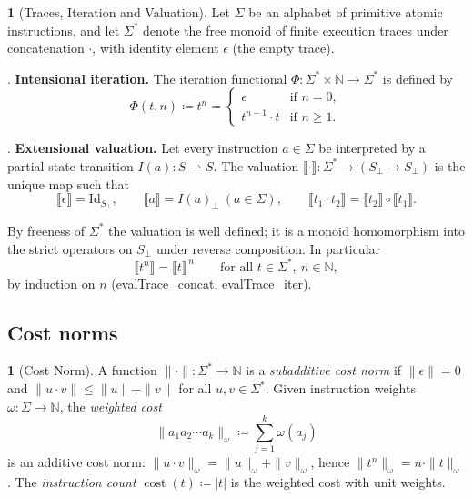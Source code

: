 \documentclass[oneside,english]{amsart}
\numberwithin{equation}{section}
\numberwithin{figure}{section}
\theoremstyle{plain}
\theoremstyle{definition}
\newtheorem{defn}[thm]{\protect\definitionname}
\theoremstyle{plain}
\theoremstyle{remark}
\theoremstyle{plain}
\theoremstyle{definition}
\theoremstyle{plain}
\theoremstyle{remark}
\DeclareMathOperator{\cost}{cost}
\newcommand{\sem}[1]{\llbracket #1 \rrbracket}
\newcommand{\lean}[1]{{\ttfamily\small #1}}
\providecommand{\definitionname}{Definition}
\begin{document}
\begin{defn}[Traces, Iteration and Valuation]
\label{def:trace-functional}
Let $\Sigma$ be an alphabet of primitive atomic instructions, and let $\Sigma^*$ denote the free monoid of finite execution traces under concatenation $\cdot$, with identity element $\epsilon$ (the empty trace).

\smallskip{}. \textbf{Intensional iteration.} The iteration functional $\Phi : \Sigma^* \times \mathbb{N} \to \Sigma^*$ is defined by
\[
\Phi(t, n) \coloneqq t^n = \begin{cases}
\epsilon & \text{if } n = 0, \\
t^{n-1} \cdot t & \text{if } n \ge 1.
\end{cases}
\]

\smallskip{}. \textbf{Extensional valuation.} Let every instruction $a \in \Sigma$ be interpreted by a partial state transition $I(a) : S \rightharpoonup S$. The valuation $\sem{\cdot} : \Sigma^* \to (S_\bot \to S_\bot)$ is the unique map such that
\[
\sem{\epsilon} = \text{Id}_{S_\bot}, \qquad \sem{a} = I(a)_\bot \ (a \in \Sigma), \qquad \sem{t_1 \cdot t_2} = \sem{t_2} \circ \sem{t_1}.
\]
\end{defn}

By freeness of $\Sigma^*$ the valuation is well defined; it is a monoid homomorphism into the strict operators on $S_\bot$ under reverse composition. In particular
\begin{equation}
\label{eq:iter-hom}
\sem{t^n} = \sem{t}^{\,n} \qquad \text{for all } t \in \Sigma^*,\ n \in \mathbb{N},
\end{equation}
by induction on $n$ (\lean{evalTrace\_\allowbreak concat}, \lean{evalTrace\_\allowbreak iter}).

\subsection{Cost norms}

\begin{defn}[Cost Norm]\label{def:subadditive-norm}
A function $\|\cdot\| : \Sigma^* \to \mathbb{N}$ is a \textit{subadditive cost norm} if $\|\epsilon\| = 0$ and
$\|u \cdot v\| \le \|u\| + \|v\|$ for all $u, v \in \Sigma^*$. Given instruction weights $\omega : \Sigma \to \mathbb{N}$, the
\textit{weighted cost}
\[
\|a_1 a_2 \cdots a_k\|_\omega \coloneqq \sum_{j=1}^{k} \omega(a_j)
\]
is an additive cost norm: $\|u \cdot v\|_\omega = \|u\|_\omega + \|v\|_\omega$, hence $\|t^n\|_\omega = n \cdot \|t\|_\omega$. The \textit{instruction count} $\cost(t) \coloneqq |t|$ is the weighted cost with unit weights.
\end{defn}
\end{document}

